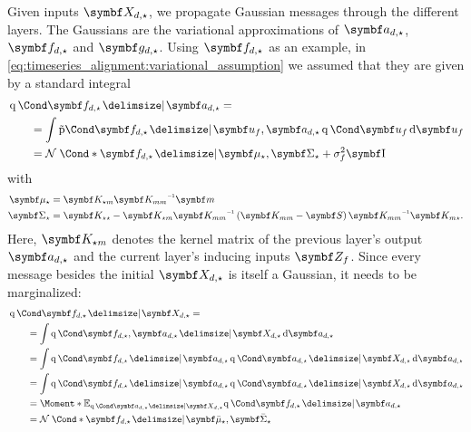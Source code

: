 Given inputs $\mat{X_{d, \star}}$, we propagate Gaussian messages through the different layers. The Gaussians are the variational approximations of $\rv{a_{d, \star}}$, $\rv{f_{d, \star}}$ and $\rv{g_{d, \star}}$.
Using $\rv{f_{d, \star}}$ as an example, in \cref{eq:timeseries_alignment:variational_assumption} we assumed that they are given by a standard integral
\begin{align}
    \begin{split}
        \MoveEqLeft\Variat{\rv{f_{d, \star}} \given \rv{a_{d, \star}}} = \\
        &= \int \aProb{\rv{f_{d, \star}} \given \rv{u_f}, \rv{a_{d, \star}}}\Variat{\rv{u_f}} \diff \rv{u_f} \\
        &= \Gaussian*{\rv{f_{d, \star}} \given \mat{\mu_{\star}}, \mat{\Sigma_{\star}} + \sigma_f^2 \Eye}
    \end{split}
\end{align}
with
\begin{align*}
    \mat{\mu_{\star}}    & = \mat{K_{\star m}}\mat{K_{mm}}\inv \mat{m}                                                                                         \\
    \mat{\Sigma_{\star}} & = \mat{K_{\star\star}} - \mat{K_{\star m}}\mat{K_{mm}}\inv \left(  \mat{K_{mm}} - \mat{S} \right) \mat{K_{mm}}\inv\mat{K_{m\star}}.
\end{align*}
Here, $\mat{K_{\star m}}$ denotes the kernel matrix of the previous layer's output $\rv{a_{d, \star}}$ and the current layer's inducing inputs $\mat{Z_f}$.
Since every message besides the initial $\rv{X_{d, \star}}$ is itself a Gaussian, it needs to be marginalized:
\begin{align}
    \begin{split}
        \MoveEqLeft\Variat{\rv{f_{d, \star}} \given \rv{X_{d, \star}}} = \\
        &= \int \Variat{\rv{f_{d, \star}}, \rv{a_{d, \star}} \given \rv{X_{d, \star}}} \diff \rv{a_{d, \star}} \\
        &= \int \Variat{\rv{f_{d, \star}} \given \rv{a_{d, \star}}} \Variat{\rv{a_{d, \star}} \given \rv{X_{d, \star}}} \diff \rv{a_{d, \star}} \\
        &= \int \Variat{\rv{f_{d, \star}} \given \rv{a_{d, \star}}} \Variat{\rv{a_{d, \star}} \given \rv{X_{d, \star}}} \diff \rv{a_{d, \star}} \\
        &= \Moment*{\E_{\Variat{\rv{a_{d, \star}} \given \rv{X_{d, \star}}}}}{\Variat{\rv{f_{d, \star}} \given \rv{a_{d, \star}}}} \\
        &= \Gaussian*{\rv{f_{d, \star}} \given \mat{\bar{\mu}_{\star}}, \mat{\bar{\Sigma}_{\star}}}
    \end{split}
\end{align}
